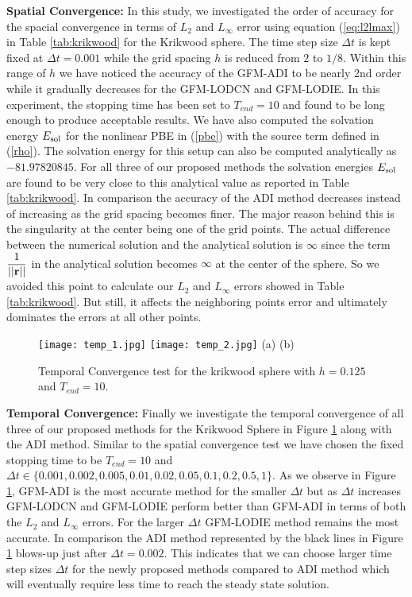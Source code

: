 \textbf{Spatial Convergence:}  In this study, we investigated the order of accuracy for the spacial convergence in terms of $L_2$ and $L_\infty$ error using equation (\ref{eq:l2lmax}) in Table \ref{tab:krikwood} for the Krikwood sphere. The time step size $\Delta t$ is kept fixed at $\Delta t = 0.001$ while the grid spacing $h$ is reduced from $2$ to $1/8$. Within this range of $h$ we have noticed the accuracy of the GFM-ADI to be nearly 2nd order while it gradually decreases for the GFM-LODCN and GFM-LODIE. In this experiment, the stopping time has been set to $T_{end} = 10$ and found to be long enough to produce acceptable results. We have also computed the solvation energy $E_{\rm sol}$ for the nonlinear PBE in (\ref{pbe}) with the source term defined in (\ref{rho}). The solvation energy for this setup can also be computed analytically as $-81.97820845$. For all three of our proposed methods the solvation energies $E_{\rm sol}$ are found to be very close to this analytical value as reported in Table \ref{tab:krikwood}. In comparison the accuracy of the ADI method decreases instead of increasing as the grid spacing becomes finer. The major reason behind this is the singularity at the center being one of the grid points. The actual difference between the numerical solution and the analytical solution is $\infty$ since the term $\displaystyle \frac{1}{||{\bf r}||} $ in the analytical solution becomes $\infty$ at the center of the sphere. So we avoided this point to calculate our $L_2$ and $L_\infty$ errors  showed in Table \ref{tab:krikwood}. But still, it affects the neighboring points error and ultimately dominates the errors at all other points.    

\begin{figure}[!t]
	\centering
\texttt{[image: temp\_1.jpg]}
\texttt{[image: temp\_2.jpg]}
   (a)\hspace*{3in} (b)\\ 	
	\caption{Temporal Convergence test for the krikwood sphere with $h=0.125$ and $T_{end} = 10$.}
	\label{fig:temp_Krik}
\end{figure}

\textbf{Temporal Convergence:} Finally we investigate the temporal convergence of all three of our proposed methods for the Krikwood Sphere in Figure \ref{fig:temp_Krik} along with the ADI method. Similar to the spatial convergence test we have chosen the fixed stopping time to be $T_{end} = 10$ and $\Delta t \in \{0.001, 0.002, 0.005,0.01, 0.02, 0.05, 0.1, 0.2, 0.5, 1\}$. As we observe in Figure \ref{fig:temp_Krik}, GFM-ADI is the most accurate method for the smaller $\Delta t$ but as $\Delta t$ increases GFM-LODCN and GFM-LODIE perform better than GFM-ADI in terms of both the $L_2$ and $L_\infty$ errors. For the larger $\Delta t $ GFM-LODIE method remains the most accurate. In comparison the ADI method represented by the black lines in Figure \ref{fig:temp_Krik} blows-up just after $\Delta t = 0.002$. This indicates that we can choose larger time step sizes $\Delta t$ for the newly proposed methods compared to ADI method which will eventually require less time to reach the steady state solution.   


